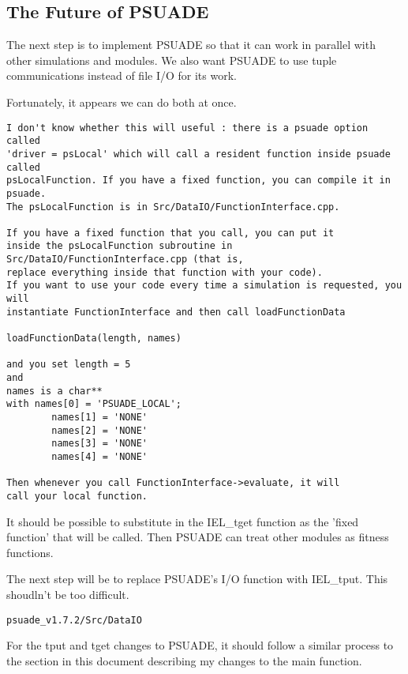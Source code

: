 \subsection{The Future of PSUADE}
The next step is to implement PSUADE so that it can work in parallel with other simulations and modules. We also want PSUADE to use tuple communications instead of file I/O for its work.

Fortunately, it appears we can do both at once. 

\begin{verbatim}
I don't know whether this will useful : there is a psuade option called
'driver = psLocal' which will call a resident function inside psuade called
psLocalFunction. If you have a fixed function, you can compile it in psuade.
The psLocalFunction is in Src/DataIO/FunctionInterface.cpp.

If you have a fixed function that you call, you can put it
inside the psLocalFunction subroutine in Src/DataIO/FunctionInterface.cpp (that is,
replace everything inside that function with your code).
If you want to use your code every time a simulation is requested, you will
instantiate FunctionInterface and then call loadFunctionData

loadFunctionData(length, names)

and you set length = 5
and 
names is a char**
with names[0] = 'PSUADE_LOCAL';
        names[1] = 'NONE'
        names[2] = 'NONE'
        names[3] = 'NONE'
        names[4] = 'NONE'

Then whenever you call FunctionInterface->evaluate, it will
call your local function.
\end{verbatim}

It should be possible to substitute in the IEL\_tget function as the 'fixed function' that will be called. Then PSUADE can treat other modules as fitness functions.


The next step will be to replace PSUADE's I/O function with IEL\_tput. This shoudln't be too difficult.

\begin{verbatim}
psuade_v1.7.2/Src/DataIO
\end{verbatim}


For the tput and tget changes to PSUADE, it should follow a similar process to the section in this document describing my changes to the main function.
